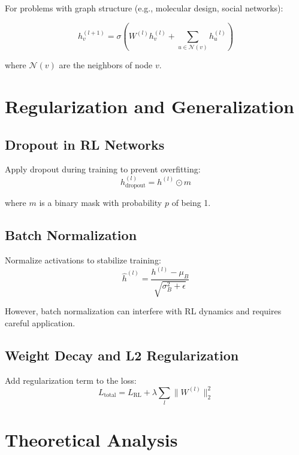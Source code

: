 For problems with graph structure (e.g., molecular design, social networks):

\begin{equation}
h_v^{(l+1)} = \sigma \left( W^{(l)} h_v^{(l)} + \sum_{u \in \mathcal{N}(v)} h_u^{(l)} \right)
\end{equation}

where $\mathcal{N}(v)$ are the neighbors of node $v$.

\section{Regularization and Generalization}

\subsection{Dropout in RL Networks}

Apply dropout during training to prevent overfitting:
\begin{equation}
h^{(l)}_{\text{dropout}} = h^{(l)} \odot m
\end{equation}

where $m$ is a binary mask with probability $p$ of being 1.

\subsection{Batch Normalization}

Normalize activations to stabilize training:
\begin{equation}
\hat{h}^{(l)} = \frac{h^{(l)} - \mu_B}{\sqrt{\sigma_B^2 + \epsilon}}
\end{equation}

However, batch normalization can interfere with RL dynamics and requires careful application.

\subsection{Weight Decay and L2 Regularization}

Add regularization term to the loss:
\begin{equation}
L_{\text{total}} = L_{\text{RL}} + \lambda \sum_l \|W^{(l)}\|_2^2
\end{equation}

\section{Theoretical Analysis}

